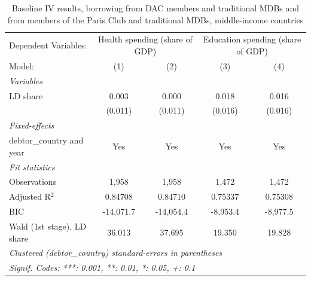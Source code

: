 
\begin{table}[htbp]
   \caption{\label{tab:results_baseline_iv_overall_dacs+mdbs_only_other} Baseline IV results, borrowing from DAC members and traditional MDBs and from members of the Paris Club and traditional MDBs, middle-income countries}
   \centering
   \begin{tabular}{lcccc}
      \tabularnewline \midrule \midrule
      Dependent Variables: & \multicolumn{2}{c}{Health spending (share of GDP)} & \multicolumn{2}{c}{Education spending (share of GDP)}\\
      Model:                     & (1)       & (2)       & (3)      & (4)\\  
      \midrule
      \emph{Variables}\\
      LD share                   & 0.003     & 0.000     & 0.018    & 0.016\\   
                                 & (0.011)   & (0.011)   & (0.016)  & (0.016)\\   
      \midrule
      \emph{Fixed-effects}\\
      debtor\_country and year   & Yes       & Yes       & Yes      & Yes\\  
      \midrule
      \emph{Fit statistics}\\
      Observations               & 1,958     & 1,958     & 1,472    & 1,472\\  
      Adjusted R$^2$             & 0.84708   & 0.84710   & 0.75337  & 0.75308\\  
      BIC                        & -14,071.7 & -14,054.4 & -8,953.4 & -8,977.5\\  
      Wald (1st stage), LD share & 36.013    & 37.695    & 19.350   & 19.828\\  
      \midrule \midrule
      \multicolumn{5}{l}{\emph{Clustered (debtor\_country) standard-errors in parentheses}}\\
      \multicolumn{5}{l}{\emph{Signif. Codes: ***: 0.001, **: 0.01, *: 0.05, +: 0.1}}\\
   \end{tabular}
\end{table}


